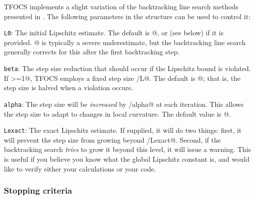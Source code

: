 \documentclass{article}
\newcommand{\<}{\langle}
\renewcommand{\>}{\rangle}
\begin{document}
TFOCS implements a slight variation of the backtracking line search methods
presented in \cite{TFOCS}. The following parameters in the \verb@opts@ structure
can be used to control it:
\begin{trivlist}
\item \texttt{L0}: The initial Lipschitz estimate. The default is @, or
\verb@Lexact@ (see below) if it is provided. @ is 
typically a severe underestimate, but the backtracking line search generally
corrects for this after the first backtracking step.
\item \texttt{beta}: The step size reduction that should occur if the Lipschitz bound
is violated. If \verb@beta>=1@, TFOCS employs a fixed step size /L@. The default
is @; that is, the step size is halved when a violation occurs.
\item \texttt{alpha}: The step size will be \emph{increased} by /alpha@
at each iteration. This allows the step size to adapt to changes in local curvature.
The default value is @.
\item \texttt{Lexact}: The exact Lipschitz estimate. If supplied, it will do
two things: first, it will prevent the step size from growing beyond /Lexact@.
Second, if the backtracking search \emph{tries} to grow it beyond this level,
it will issue a warning. This is useful if you believe you know what the global
Lipschitz constant is, and would like to verify either your calculations or
your code.
\end{trivlist}

\subsubsection{Stopping criteria}
\end{document}
